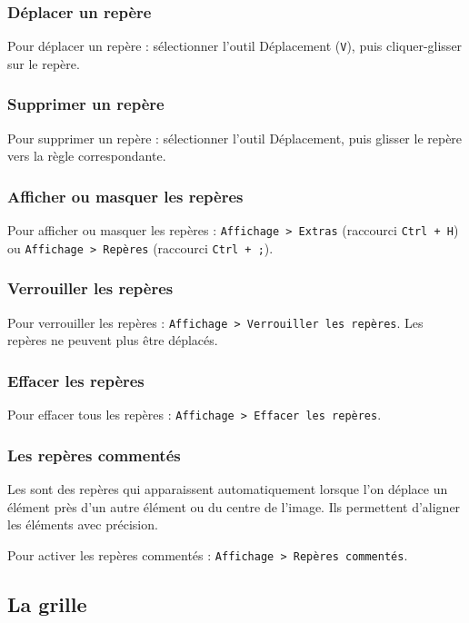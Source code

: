 \subsubsection{Déplacer un repère}

Pour déplacer un repère : sélectionner l'outil Déplacement (\texttt{V}), puis cliquer-glisser sur le repère.

\subsubsection{Supprimer un repère}

Pour supprimer un repère : sélectionner l'outil Déplacement, puis glisser le repère vers la règle correspondante.

\subsubsection{Afficher ou masquer les repères}

Pour afficher ou masquer les repères : \texttt{Affichage > Extras} (raccourci \texttt{Ctrl + H}) ou \texttt{Affichage > Repères} (raccourci \texttt{Ctrl + ;}).

\subsubsection{Verrouiller les repères}

Pour verrouiller les repères : \texttt{Affichage > Verrouiller les repères}. Les repères ne peuvent plus être déplacés.

\subsubsection{Effacer les repères}

Pour effacer tous les repères : \texttt{Affichage > Effacer les repères}.

\subsubsection{Les repères commentés}

Les  sont des repères qui apparaissent automatiquement lorsque l'on déplace un élément près d'un autre élément ou du centre de l'image. Ils permettent d'aligner les éléments avec précision.

Pour activer les repères commentés : \texttt{Affichage > Repères commentés}.

\subsection{La grille}

